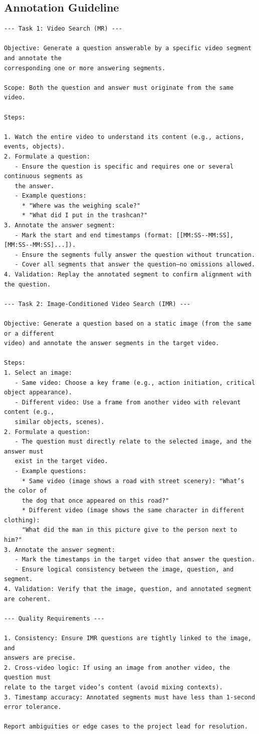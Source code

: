 \documentclass{article}
\begin{document}
\subsection*{Annotation Guideline}\label{app:annotation}

\begin{Verbatim}
--- Task 1: Video Search (MR) ---

Objective: Generate a question answerable by a specific video segment and annotate the 
corresponding one or more answering segments.

Scope: Both the question and answer must originate from the same video.

Steps:

1. Watch the entire video to understand its content (e.g., actions, events, objects).
2. Formulate a question:
   - Ensure the question is specific and requires one or several continuous segments as 
   the answer.
   - Example questions:
     * "Where was the weighing scale?"
     * "What did I put in the trashcan?"
3. Annotate the answer segment:
   - Mark the start and end timestamps (format: [[MM:SS--MM:SS], [MM:SS--MM:SS]...]).
   - Ensure the segments fully answer the question without truncation.
   - Cover all segments that answer the question—no omissions allowed.
4. Validation: Replay the annotated segment to confirm alignment with the question.

--- Task 2: Image-Conditioned Video Search (IMR) ---

Objective: Generate a question based on a static image (from the same or a different 
video) and annotate the answer segments in the target video.

Steps:
1. Select an image:
   - Same video: Choose a key frame (e.g., action initiation, critical object appearance).
   - Different video: Use a frame from another video with relevant content (e.g., 
   similar objects, scenes).
2. Formulate a question:
   - The question must directly relate to the selected image, and the answer must 
   exist in the target video.
   - Example questions:
     * Same video (image shows a road with street scenery): "What’s the color of 
     the dog that once appeared on this road?"
     * Different video (image shows the same character in different clothing): 
     "What did the man in this picture give to the person next to him?"
3. Annotate the answer segment:
   - Mark the timestamps in the target video that answer the question.
   - Ensure logical consistency between the image, question, and segment.
4. Validation: Verify that the image, question, and annotated segment are coherent.

--- Quality Requirements ---

1. Consistency: Ensure IMR questions are tightly linked to the image, and 
answers are precise.
2. Cross-video logic: If using an image from another video, the question must 
relate to the target video’s content (avoid mixing contexts).
3. Timestamp accuracy: Annotated segments must have less than 1-second error tolerance.

Report ambiguities or edge cases to the project lead for resolution.
\end{Verbatim}
\end{document}

